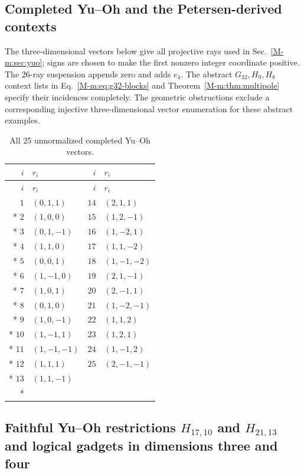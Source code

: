 \documentclass[aps,pra,reprint,superscriptaddress,longbibliography,nofootinbib,floatfix,10pt]{revtex4-2}
\theoremstyle{definition}
\begin{document}
\subsection{Completed Yu--Oh and the Petersen-derived contexts}
\label{app:yo-vectors}
The three-dimensional vectors below give all projective rays used in
Sec.~\ref{M-m:sec:yuo}; signs are chosen to make the first nonzero
integer coordinate positive. The 26-ray suspension appends zero and adds
$e_4$. The abstract $G_{32},H_9,H_8$ context lists in
Eq.~\eqref{M-m:eq:g32-blocks} and Theorem~\ref{M-m:thm:multipole} specify their
incidences completely. The geometric obstructions exclude a corresponding
injective three-dimensional vector enumeration for these abstract examples.
\begingroup\small
{}
\begin{longtable}{rl@{\qquad\qquad}rl}
\caption{All 25 unnormalized completed Yu--Oh vectors.}\label{tab:yo-all-vectors}\\
\toprule
$i$ & $r_i$ & $i$ & $r_i$\\\midrule
\endfirsthead
\toprule
$i$ & $r_i$ & $i$ & $r_i$\\\midrule
\endhead
\bottomrule\endfoot
$1$ & $(0,1,1)$ & $14$ & $(2,1,1)$\\*
$2$ & $(1,0,0)$ & $15$ & $(1,2,-1)$\\*
$3$ & $(0,1,-1)$ & $16$ & $(1,-2,1)$\\*
$4$ & $(1,1,0)$ & $17$ & $(1,1,-2)$\\*
$5$ & $(0,0,1)$ & $18$ & $(1,-1,-2)$\\*
$6$ & $(1,-1,0)$ & $19$ & $(2,1,-1)$\\*
$7$ & $(1,0,1)$ & $20$ & $(2,-1,1)$\\*
$8$ & $(0,1,0)$ & $21$ & $(1,-2,-1)$\\*
$9$ & $(1,0,-1)$ & $22$ & $(1,1,2)$\\*
$10$ & $(1,-1,1)$ & $23$ & $(1,2,1)$\\*
$11$ & $(1,-1,-1)$ & $24$ & $(1,-1,2)$\\*
$12$ & $(1,1,1)$ & $25$ & $(2,-1,-1)$\\*
$13$ & $(1,1,-1)$ &  & \\*
\end{longtable}
\endgroup


\subsection{Faithful Yu--Oh restrictions \texorpdfstring{$H_{17,10}$ and $H_{21,13}$}{H17,10 and H21,13} and logical gadgets in dimensions three and four}\label{app:gadget-vectors}
\end{document}
